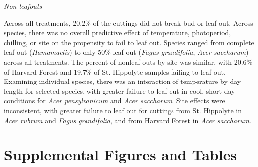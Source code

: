 \documentclass{article}
\begin{document}
\noindent\emph{Non-leafouts}

\noindent Across all treatments, 20.2\% of the cuttings did not break bud or leaf out. Across species, there was no overall predictive effect of temperature, photoperiod, chilling, or site on the propensity to fail to leaf out. Species ranged from complete leaf out (\emph{Hamamaelis}) to only 50\% leaf out (\emph{Fagus grandifolia}, \emph{Acer saccharum}) across all treatments. The percent of nonleaf outs by site was similar, with 20.6\% of Harvard Forest and 19.7\% of St. Hippolyte samples failing to leaf out. Examining individual species,  there was an interaction of temperature by day length for selected species, with greater failure to leaf out in cool, short-day conditions for \emph{Acer pensylvanicum}  and \emph{Acer saccharum}. Site effects were inconsistent, with greater failure to leaf out for cuttings from St. Hippolyte in \emph{Acer rubrum} and \emph{Fagus grandifolia}, and from Harvard Forest in \emph{Acer saccharum}. 





\section*{Supplemental Figures and Tables}
\end{document}
